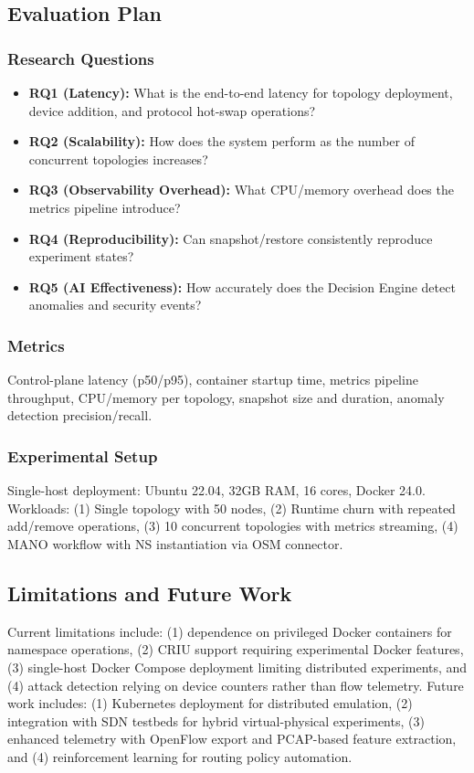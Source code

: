 \documentclass[10pt,a4paper]{article}
\begin{document}
\subsection{Evaluation Plan}

\subsubsection{Research Questions}
\begin{itemize}
\item \textbf{RQ1 (Latency):} What is the end-to-end latency for topology deployment, device addition, and protocol hot-swap operations?
\item \textbf{RQ2 (Scalability):} How does the system perform as the number of concurrent topologies increases?
\item \textbf{RQ3 (Observability Overhead):} What CPU/memory overhead does the metrics pipeline introduce?
\item \textbf{RQ4 (Reproducibility):} Can snapshot/restore consistently reproduce experiment states?
\item \textbf{RQ5 (AI Effectiveness):} How accurately does the Decision Engine detect anomalies and security events?
\end{itemize}

\subsubsection{Metrics}
Control-plane latency (p50/p95), container startup time, metrics pipeline throughput, CPU/memory per topology, snapshot size and duration, anomaly detection precision/recall.

\subsubsection{Experimental Setup}
Single-host deployment: Ubuntu 22.04, 32GB RAM, 16 cores, Docker 24.0. Workloads: (1) Single topology with 50 nodes, (2) Runtime churn with repeated add/remove operations, (3) 10 concurrent topologies with metrics streaming, (4) MANO workflow with NS instantiation via OSM connector.

\subsection{Limitations and Future Work}

Current limitations include: (1) dependence on privileged Docker containers for namespace operations, (2) CRIU support requiring experimental Docker features, (3) single-host Docker Compose deployment limiting distributed experiments, and (4) attack detection relying on device counters rather than flow telemetry. Future work includes: (1) Kubernetes deployment for distributed emulation, (2) integration with SDN testbeds for hybrid virtual-physical experiments, (3) enhanced telemetry with OpenFlow export and PCAP-based feature extraction, and (4) reinforcement learning for routing policy automation.
\end{document}
